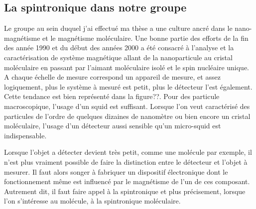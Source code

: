 \subsection{La spintronique dans notre groupe}
Le groupe au sein duquel j'ai effectué ma thèse a une culture ancré dans le nano-magnétisme et le magnétisme moléculaire. Une bonne partie des efforts de la fin des année 1990 et du début des années 2000 a été consacré à l'analyse et la caractérisation de système magnétique allant de la nanoparticule au cristal moléculaire en passant par l'aimant moléculaire isolé et le spin nucléaire unique. A chaque échelle de mesure correspond un appareil de mesure, et assez logiquement, plus le système à mesuré est petit, plus le détecteur l'est également. Cette tendance est bien représenté dans la figure??. Pour des particule macroscopique, l'usage d'un squid est suffisant. Lorsque l'on veut caractérisé des particules de l'ordre de quelques dizaines de nanomètre ou bien encore un cristal moléculaire, l'usage d'un détecteur aussi sensible qu'un micro-squid est indispensable.

Lorsque l'objet a détecter devient très petit, comme une molécule par exemple, il n'est plus vraiment possible de faire la distinction entre le détecteur et l'objet à mesurer. Il faut alors songer à fabriquer un dispositif électronique dont le fonctionnement même est influencé par le magnétisme de l'un de ces composant. Autrement dit, il faut faire appel à la spintronique et plus précisement, lorsque l'on s'intéresse au molécule, à la spintronique moléculaire.